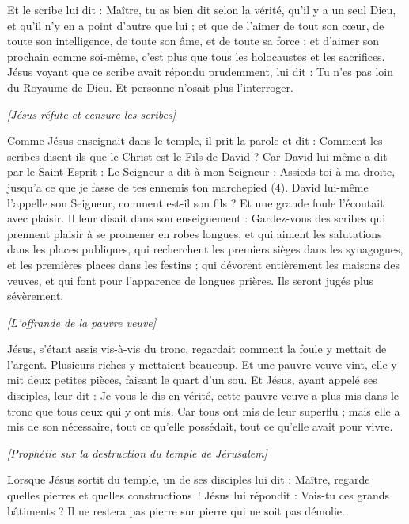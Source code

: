 \begin{multicols}{2}
Et le scribe lui dit : Maître, tu as bien dit selon la vérité, qu'il y a un seul Dieu, et qu'il n'y en a point d'autre que lui ;
et que de l'aimer de tout son cœur, de toute son intelligence, de toute son âme, et de toute sa force ; et d'aimer son prochain comme soi-même, c'est plus que tous les holocaustes et les sacrifices.
Jésus voyant que ce scribe avait répondu prudemment, lui dit : Tu n'es pas loin du Royaume de Dieu. Et personne n'osait plus l'interroger.
\begin{center}
\textit{[Jésus réfute et censure les scribes]}
\end{center}
\PPE{}
Comme Jésus enseignait dans le temple, il prit la parole et dit : Comment les scribes disent-ils que le Christ est le Fils de David ?
Car David lui-même a dit par le Saint-Esprit : Le Seigneur a dit à mon Seigneur : Assieds-toi à ma droite, jusqu'a ce que je fasse de tes ennemis ton marchepied (4).
David lui-même l'appelle son Seigneur, comment est-il son fils ? Et une grande foule l’écoutait avec plaisir.
Il leur disait dans son enseignement : Gardez-vous des scribes qui prennent plaisir à se promener en robes longues, et qui aiment les salutations dans les places publiques,
qui recherchent les premiers sièges dans les synagogues, et les premières places dans les festins ;
qui dévorent entièrement les maisons des veuves, et qui font pour l’apparence de longues prières. Ils seront jugés plus sévèrement.
\begin{center}
\textit{[L'offrande de la pauvre veuve]}
\end{center}
\PPE{}
Jésus, s’étant assis vis-à-vis du tronc, regardait comment la foule y mettait de l'argent. Plusieurs riches y mettaient beaucoup.
Et une pauvre veuve vint, elle y mit deux petites pièces, faisant le quart d’un sou.
Et Jésus, ayant appelé ses disciples, leur dit : Je vous le dis en vérité, cette pauvre veuve a plus mis dans le tronc que tous ceux qui y ont mis.
Car tous ont mis de leur superflu ; mais elle a mis de son nécessaire, tout ce qu'elle possédait, tout ce qu’elle avait pour vivre.
\begin{center}
\textit{[Prophétie sur la destruction du temple de Jérusalem]}
\end{center}
\VerseOne{}Lorsque Jésus sortit du temple, un de ses disciples lui dit : Maître, regarde quelles pierres et quelles constructions !
Jésus lui répondit : Vois-tu ces grands bâtiments ? Il ne restera pas pierre sur pierre qui ne soit pas démolie.

\end{multicols}
